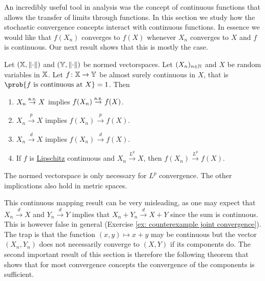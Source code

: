 An incredibly useful tool in analysis was the concept of continuous functions
that allows the transfer of limits through functions. In this section
we study how the stochastic convergence concepts interact with continuous
functions. In essence we would like that \(f(X_n)\) converges to \(f(X)\)
whenever \(X_n\) converges to \(X\) and \(f\) is continuous.
Our next result shows that this is mostly the case.

\begin{mdframed}[innertopmargin=0pt]
\begin{theorem}
    \label{thm: continuous mapping}
    Let \((\mathbb{X}, \lVert\cdot\rVert)\) and \((\mathbb{Y}, \lVert\cdot\rVert)\) be normed
    vectorspaces.  Let \((X_n)_{n\in \mathbb{N}}\) and \(X\) be random variables in
    \(\mathbb{X}\). Let \(f\colon \mathbb{X} \to \mathbb{Y}\) be almost
    surely continuous in \(X\), that is \(\prob{f \text{ is continuous at } X} =
    1\). Then
    \begin{enumerate}[label=(\roman*)]
        \item\label{it: cont. mapping as} \(X_n \overset{\operatorname{\text{a.s.}}}\to X\) implies \(f(X_n) \overset{\operatorname{\text{a.s.}}}\to f(X)\).
        \item\label{it: cont. mapping p} \(X_n \overset{p}\to X\) implies \(f(X_n) \overset{p}\to f(X)\).
        \item\label{it: cont. mapping d} \(X_n \overset{d}\to X\) implies \(f(X_n) \overset{d}\to f(X)\).
        \item\label{it: cont. mapping Lp} If \(f\) is \underline{Lipschitz} continuous and \(X_n \overset{L^p}\to X\),
        then \(f(X_n) \overset{L^p}\to f(X)\).
    \end{enumerate}
\end{theorem}
\end{mdframed}

\begin{remark}[Generalization]
    The normed vectorspace is only necessary for \(L^p\) convergence. The other
    implications also hold in metric spaces.
\end{remark}

This continuous mapping result can be very misleading, as one may expect that
\(X_n \overset{d} \to X\) and \(Y_n \overset{d} \to Y\) implies that \(X_n + Y_n
\overset{d} \to X + Y\) since the sum is continuous. This is however
false in general (Exercise \ref{ex: counterexample joint convergence}).
The trap is that the function \((x,y) \mapsto x+y\) may be continuous
but the vector \((X_n, Y_n)\) does not necessarily converge to \((X,Y)\)
if its components do. The second important result of this section
is therefore the following theorem that shows that for most convergence
concepts the convergence of the components is sufficient.

